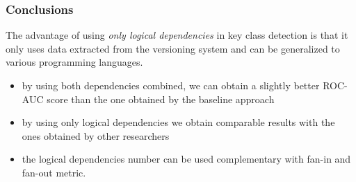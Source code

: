 \documentclass{beamer}
\begin{document}
 \begin{frame}
\frametitle{Conclusions}
 The advantage of using \textit{only logical dependencies} in key class detection is that it only uses data extracted from the versioning system
and can be generalized to various programming languages.

\begin{itemize}
\item by using both dependencies combined, we can obtain a slightly better ROC-AUC score than the one obtained by the baseline approach
\item by using only logical dependencies we obtain comparable  results with the ones obtained by other researchers
\end{itemize}

\begin{table}[!h]
\renewcommand{\arraystretch}{1}
\label{tab:measurementstop:ant}
\centering
{}
\end{table}



\begin{itemize}
\item the logical dependencies number can be used complementary with fan-in and fan-out metric.
\end{itemize}



\end{frame}

\begin{frame}

\footnotesize

\end{frame}
\end{document}
